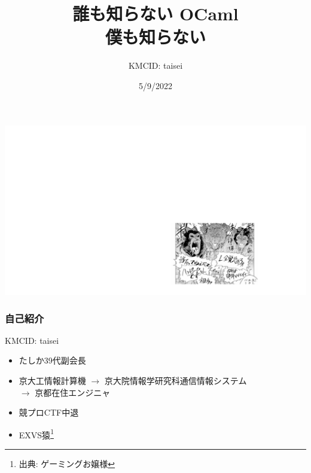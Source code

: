 \documentclass[dvipdfmx,14pt,notheorems,aspectratio=169]{beamer}
\title[]{誰も知らない OCaml\\{\small 僕も知らない}}%
\author[]{\large KMCID: taisei}%
\date{5/9/2022}%
\theoremstyle{definition}
\begin{document}
    
    {
    }
    \begin{frame}
    \titlepage %
    \end{frame}
    {
    
    }

    {
        \begin{centering}
            \includegraphics[width=\paperwidth]{chimpanzee.png}
        \end{centering}
    }
    \begin{frame}[fragile]\frametitle{自己紹介}
        KMCID: taisei
        \begin{itemize}
            \item たしか39代副会長
            \item 京大工情報計算機 $\rightarrow$ 京大院情報学研究科通信情報システム \\
            $\rightarrow$ 京都在住エンジニャ
            \item 競プロCTF中退
            \item EXVS猿\footnote{出典: ゲーミングお嬢様}
        \end{itemize}
    \end{frame}
    {}

\end{document}
